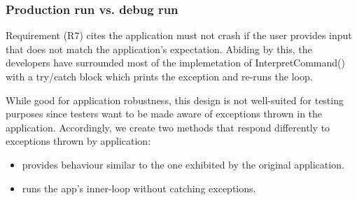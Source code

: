 \subsubsection{Production run vs. debug run}
\label{sec:}
Requirement (R7) cites the application must not crash if the user provides input that does not match the application's expectation. Abiding by this, the developers have surrounded most of the implemetation of InterpretCommand() with a try/catch block which prints the exception and re-runs the loop. 
\par 
While good for application robustness, this design is not well-suited for testing purposes since testers want to be made aware of exceptions thrown in the application. Accordingly, we create two methods that respond differently to exceptions thrown by application: 

\begin{itemize}
	\item {} provides behaviour similar to the one exhibited by the original application.
	\item {} runs the app's inner-loop without catching exceptions.
\end{itemize}




